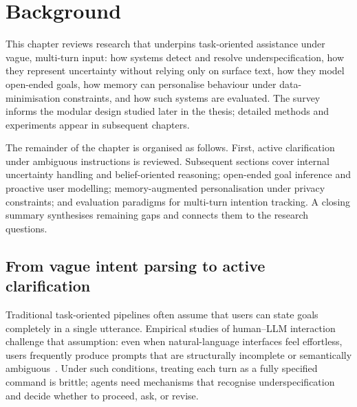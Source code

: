 
\chapter{Background}
\label{ch:background}

This chapter reviews research that underpins task-oriented assistance under vague, multi-turn input: how systems detect and resolve underspecification, how they represent uncertainty without relying only on surface text, how they model open-ended goals, how memory can personalise behaviour under data-minimisation constraints, and how such systems are evaluated.
The survey informs the modular design studied later in the thesis; detailed methods and experiments appear in subsequent chapters.

The remainder of the chapter is organised as follows.
First, active clarification under ambiguous instructions is reviewed.
Subsequent sections cover internal uncertainty handling and belief-oriented reasoning; open-ended goal inference and proactive user modelling; memory-augmented personalisation under privacy constraints; and evaluation paradigms for multi-turn intention tracking.
A closing summary synthesises remaining gaps and connects them to the research questions.

\section{From vague intent parsing to active clarification}
\label{sec:vague-clarification}

Traditional task-oriented pipelines often assume that users can state goals completely in a single utterance.
Empirical studies of human--LLM interaction challenge that assumption: even when natural-language interfaces feel effortless, users frequently produce prompts that are structurally incomplete or semantically ambiguous~\cite{koyuturk_understanding_2025}.
Under such conditions, treating each turn as a fully specified command is brittle; agents need mechanisms that recognise underspecification and decide whether to proceed, ask, or revise.


